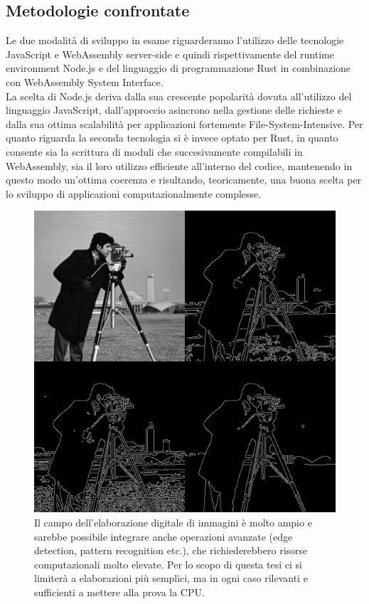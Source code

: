\subsection{Metodologie confrontate}
Le due modalità di sviluppo in esame riguarderanno l'utilizzo delle tecnologie JavaScript e WebAssembly server-side e quindi rispettivamente del runtime environment Node.js e del linguaggio di programmazione Rust in combinazione con WebAssembly System Interface. 
\\La scelta di Node.js deriva dalla sua crescente popolarità dovuta all'utilizzo del linguaggio JavaScript, dall'approccio asincrono nella gestione delle richieste e dalla sua ottima scalabilità per applicazioni fortemente File-System-Intensive.
Per quanto riguarda la seconda tecnologia si è invece optato per Rust, in quanto consente sia la scrittura di moduli che succesivamente compilabili in WebAssembly, sia il loro utilizzo efficiente all'interno del codice, mantenendo in questo modo un'ottima coerenza e risultando, teoricamente, una buona scelta per lo sviluppo di applicazioni computazionalmente complesse. 
\begin{figure}
        \begin{center}
                \includegraphics[width=0.7\columnwidth]{images/imageProc.jpg}
        \end{center}
        \caption{Il campo dell'elaborazione digitale di immagini è molto ampio e sarebbe possibile integrare anche operazioni avanzate (edge detection, pattern recognition etc.), che richiederebbero risorse computazionali molto elevate. Per lo scopo di questa tesi ci si limiterà a elaborazioni più semplici, ma in ogni caso rilevanti e sufficienti a mettere alla prova la CPU.}
        \label{fig:imageProc}
\end{figure} 
